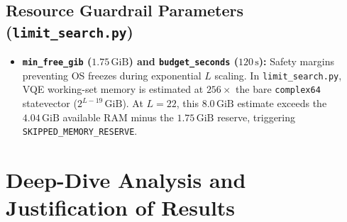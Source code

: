 \documentclass[11pt,a4paper]{article}
\begin{document}
\subsection{Resource Guardrail Parameters (\texttt{limit\_search.py})}
\begin{itemize}[leftmargin=*]
\item \textbf{\texttt{min\_free\_gib} ($1.75\,\mathrm{GiB}$) and \texttt{budget\_seconds} ($120\,\mathrm{s}$):} Safety margins preventing OS freezes during exponential $L$ scaling. In \texttt{limit\_search.py}, VQE working-set memory is estimated at $256\times$ the bare \texttt{complex64} statevector ($2^{L-19}\,\mathrm{GiB}$). At $L=22$, this $8.0\,\mathrm{GiB}$ estimate exceeds the $4.04\,\mathrm{GiB}$ available RAM minus the $1.75\,\mathrm{GiB}$ reserve, triggering \texttt{SKIPPED\_MEMORY\_RESERVE}.
\end{itemize}

\section{Deep-Dive Analysis and Justification of Results}
\end{document}
